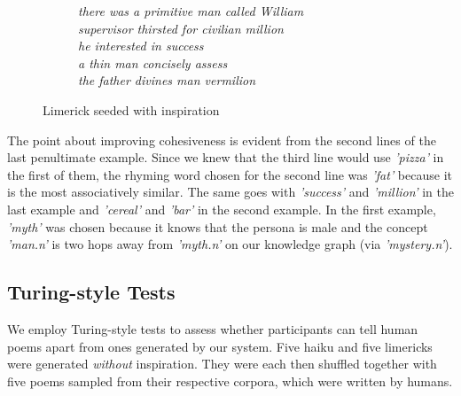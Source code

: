 \begin{figure}[H]
\centering
\begin{subfigure}[t!]{0.4\textwidth}
	\centering
\end{subfigure}
\begin{subfigure}[t!]{0.5\textwidth}
	\centering
    \textit{there was a primitive man called William\\supervisor thirsted for civilian million\\he interested in success\\a thin man concisely assess\\the father divines man vermilion}
\end{subfigure}
\caption{Limerick seeded with inspiration}
\label{fig:inspr-lim4}
\end{figure}

The point about improving cohesiveness is evident from the second lines of the last penultimate example. Since we knew that the third line would use \textit{'pizza'} in the first of them, the rhyming word chosen for the second line was \textit{'fat'} because it is the most associatively similar. The same goes with \textit{'success'} and \textit{'million'} in the last example and \textit{'cereal'} and \textit{'bar'} in the second example. In the first example, \textit{'myth'} was chosen because it knows that the persona is male and the concept \textit{'man.n'} is two hops away from \textit{'myth.n'} on our knowledge graph (via \textit{'mystery.n'}).

\subsection{Turing-style Tests}
We employ Turing-style tests to assess whether participants can tell human poems apart from ones generated by our system. Five haiku and five limericks were generated \textit{without} inspiration. They were each then shuffled together with five poems sampled from their respective corpora, which were written by humans. 

